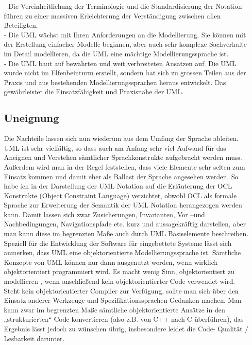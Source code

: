- Die Vereinheitlichung der Terminologie und die Standardisierung der Notation
führen zu einer massiven Erleichterung der Verständigung zwischen allen
Beteiligten.\\
- Die UML wächst mit Ihren Anforderungen an die Modellierung. Sie können mit der
Erstellung einfacher Modelle beginnen, aber auch sehr komplexe Sachverhalte im
Detail modellieren, da die UML eine mächtige Modellierungssprache ist.\\
- Die UML baut auf bewährten und weit verbreiteten Ansätzen auf. Die UML wurde
nicht im Elfenbeinturm erstellt, sondern hat sich zu grossen Teilen aus der Praxis
und aus bestehenden Modellierungssprachen heraus entwickelt. Das gewährleistet
die Einsatzfähigkeit und Praxisnähe der UML.\\

\subsection{Uneignung}
Die Nachteile lassen sich nun wiederum aus dem Umfang der Sprache ableiten. UML ist sehr vielfältig, so dass auch am Anfang  sehr viel Aufwand für das Aneignen und Verstehen sämtlicher Sprachkonstrukte aufgebracht werden muss.\\ Außerdem wird man in der  Regel feststellen, dass viele Elemente sehr selten zum Einsatz kommen und damit eher als Ballast der Sprache angesehen werden. So habe ich in der Darstellung der UML Notation auf die Erläuterung der OCL Konstrukte (Object Constraint Language) verzichtet, obwohl OCL als formale Sprache zur Erweiterung der Semantik der UML Notation herangezogen werden kann. Damit lassen sich zwar Zusicherungen, Invarianten, Vor –und Nachbedingungen, Navigationspfade etc. kurz und aussagekräftig darstellen, aber man kann diese im begrenzten Maße auch durch UML Basiselemente beschreiben.\\
Speziell für die Entwicklung der Software für eingebettete Systeme lässt sich anmerken, dass UML eine objektorientierte Modellierungssprache ist. Sämtliche Konzepte von UML können nur dann ausgenutzt werden, wenn wirklich objektorientiert programmiert wird. Es macht wenig Sinn, objektorientiert zu modellieren , wenn  anschließend kein objektorientierter Code verwendet wird. Steht kein objektorientierter Compiler zur Verfügung, sollte man sich über den Einsatz anderer Werkzeuge und Spezifikationssprachen Gedanken machen. Man kann zwar im begrenzten Maße sämtliche objektorientierte Ansätze in den „strukturierten“ Code konvertieren (also z.B. von C++ nach C überführen), das Ergebnis lässt jedoch zu wünschen übrig, insbesondere leidet die Code- Qualität / Lesbarkeit darunter.\\

